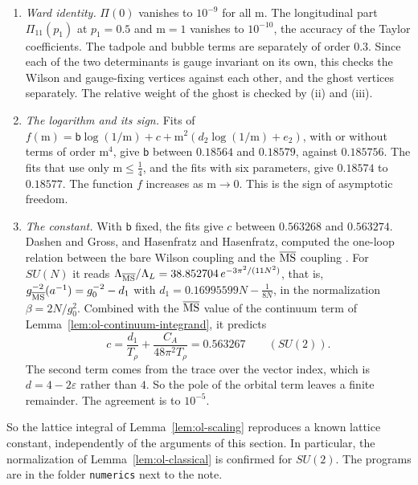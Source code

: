 \begin{enumerate}[label=(\roman*)]
\item \emph{Ward identity.} $\Pi(0)$ vanishes to $10^{-9}$ for all $\mathrm m$. The longitudinal part $\Pi_{11}(p_1)$ at $p_1=0.5$ and $\mathrm m=1$ vanishes to $10^{-10}$, the accuracy of the Taylor coefficients. The tadpole and bubble terms are separately of order $0.3$. Since each of the two determinants is gauge invariant on its own, this checks the Wilson and gauge-fixing vertices against each other, and the ghost vertices separately. The relative weight of the ghost is checked by (ii) and (iii).
\item \emph{The logarithm and its sign.} Fits of $f(\mathrm m)=\mathsf b\log(1/\mathrm m)+c+\mathrm m^2(d_2\log(1/\mathrm m)+e_2)$, with or without terms of order $\mathrm m^4$, give $\mathsf b$ between $0.18564$ and $0.18579$, against $0.185756$. The fits that use only $\mathrm m\le\frac14$, and the fits with six parameters, give $0.18574$ to $0.18577$. The function $f$ increases as $\mathrm m\to0$. This is the sign of asymptotic freedom.
\item \emph{The constant.} With $\mathsf b$ fixed, the fits give $c$ between $0.563268$ and $0.563274$. Dashen and Gross, and Hasenfratz and Hasenfratz, computed the one-loop relation between the bare Wilson coupling and the $\overline{\rm MS}$ coupling \cite{DashenGross,HasenfratzLambda}. For $SU(N)$ it reads $\Lambda_{\overline{\rm MS}}/\Lambda_L=38.852704\,e^{-3\pi^2/(11N^2)}$, that is, $g_{\overline{\rm MS}}^{-2}(a^{-1})=g_0^{-2}-d_1$ with $d_1=0.16995599N-\frac1{8N}$, in the normalization $\beta=2N/g_0^2$. Combined with the $\overline{\rm MS}$ value of the continuum term of Lemma~\ref{lem:ol-continuum-integrand}, it predicts
\[
c=\frac{d_1}{T_\rho}+\frac{C_A}{48\pi^2T_\rho}=0.563267\qquad(SU(2)).
\]
The second term comes from the trace over the vector index, which is $d=4-2\varepsilon$ rather than $4$. So the pole of the orbital term leaves a finite remainder. The agreement is to $10^{-5}$.
\end{enumerate}
So the lattice integral of Lemma~\ref{lem:ol-scaling} reproduces a known lattice constant, independently of the arguments of this section. In particular, the normalization of Lemma~\ref{lem:ol-classical} is confirmed for $SU(2)$. The programs are in the folder \texttt{numerics} next to the note.

